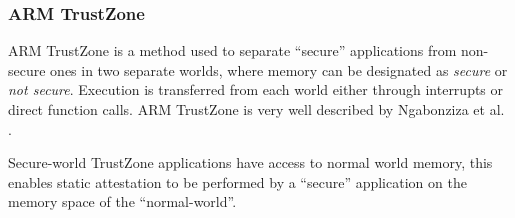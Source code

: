\subsubsection*{ARM TrustZone}

ARM TrustZone is a method used to separate ``secure'' applications from non-secure ones in two separate worlds, where memory can be designated as \textit{secure} or \textit{not secure}. Execution is transferred from each world either through interrupts or direct function calls. ARM TrustZone is very well described by Ngabonziza et al. \cite{Ngabonziza2017}.

Secure-world TrustZone applications have access to normal world memory, this enables static attestation to be performed by a ``secure'' application on the memory space of the ``normal-world''.
